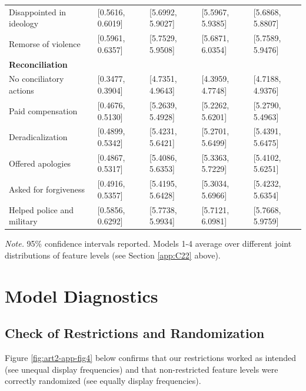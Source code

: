 \begin{table}[H]
\begin{threeparttable}
\begin{tabular}{lllll}
Disappointed in ideology & [0.5616, 0.6019]             & [5.6992, 5.9027]      & [5.5967, 5.9385]      & [5.6868, 5.8807]\\ 
Remorse of violence      & [0.5961, 0.6357]             & [5.7529, 5.9508]      & [5.6871, 6.0354]      & [5.7589, 5.9476]\\ [0.9ex]
\textbf{Reconciliation} \\  
No conciliatory actions & [0.3477, 0.3904]              & [4.7351, 4.9643]      & [4.3959, 4.7748]      & [4.7188, 4.9376]\\ 
Paid compensation & [0.4676, 0.5130]                    & [5.2639, 5.4928]      & [5.2262, 5.6201]      & [5.2790, 5.4963]\\ 
Deradicalization & [0.4899, 0.5342]           & [5.4231, 5.6421]      & [5.2701, 5.6499]      & [5.4391, 5.6475]\\ 
Offered apologies  &  [0.4867, 0.5317]                  & [5.4086, 5.6353]      & [5.3363, 5.7229]      & [5.4102, 5.6251]\\ 
Asked for forgiveness & [0.4916, 0.5357]                & [5.4195, 5.6428]      & [5.3034, 5.6966]      & [5.4232, 5.6354]\\ 
Helped police and military & [0.5856, 0.6292]           & [5.7738, 5.9934]      & [5.7121, 6.0981]      & [5.7668, 5.9759]\\ 
\midrule
\bottomrule
\end{tabular}
\begin{tablenotes}
\footnotesize
\item[]\textit{Note.} 95\% confidence intervals reported. Models 1-4 average over different joint distributions of feature levels (see Section \ref{app:C22} above). 
\end{tablenotes}
\end{threeparttable}
\end{table}

\newpage
\section{Model Diagnostics}
\label{app:C3}
\subsection{Check of Restrictions and Randomization}
Figure \ref{fig:art2-app-fig4} below confirms that our restrictions worked as intended (see unequal display frequencies) and that non-restricted feature levels were correctly randomized (see equally display frequencies).

